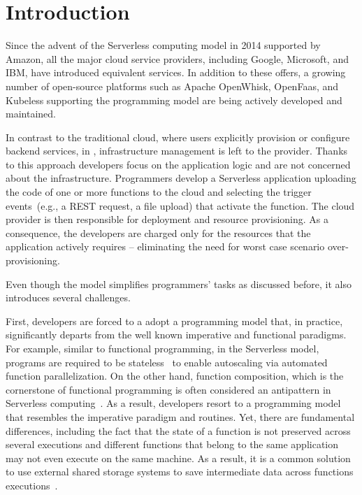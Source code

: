 
\section{Introduction}

Since the advent of the \faas Serverless computing model in 2014  
supported by Amazon,
all the major cloud service providers, including 
Google,
Microsoft,
and IBM,
have introduced equivalent services. 
%
In addition to these offers, a growing number of open-source platforms 
such as Apache OpenWhisk,
OpenFaas,
and Kubeless
supporting the \faas programming model are being actively developed and maintained.

In contrast to the traditional cloud, where users explicitly provision or configure 
backend services, in \faas, infrastructure management is left to the provider.
Thanks to this approach developers focus on the application logic and 
are not concerned about the infrastructure. 
Programmers develop a Serverless application uploading the code of one or more 
functions to the cloud and selecting the trigger events~(e.g., a REST request, 
a file upload) that activate the function. The cloud provider is then responsible for 
deployment and resource provisioning. As a consequence, the developers are  
charged only for the resources that the application actively requires -- eliminating the 
need for worst case scenario over-provisioning.

Even though the \faas model simplifies programmers' tasks 
as discussed before, it also introduces several challenges.

First, developers are forced to a adopt a programming model that, in practice,
significantly departs from the well known imperative and functional paradigms.
For example, similar to functional programming, in the Serverless model, 
programs are required to be stateless~\cite{hellerstein2018serverless} 
to enable autoscaling via automated function parallelization.
On the other hand, function composition, which is the cornerstone of functional programming
is often considered an antipattern in Serverless computing~\cite{baldini2017serverless}.
%
As a result, developers resort to a programming model that 
resembles the imperative paradigm and routines.
Yet, there are fundamental differences, including the fact that 
the state of a function is not preserved across several executions and
different functions that belong to the same application may not even execute 
on the same machine. As a result, it is a common solution 
to use external shared storage systems 
to save intermediate data across functions 
executions~\cite{klimovic2018understanding}.



